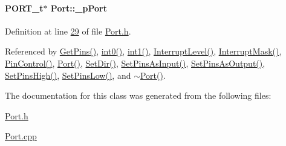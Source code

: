\hypertarget{class_port_a1475caa8ec2e667350eae96d4b7a28ac}{
\paragraph[{\_\-pPort}]{\setlength{\rightskip}{0pt plus 5cm}PORT\_\-t$\ast$ {\bf Port::\_\-pPort}}\hfill}
\label{class_port_a1475caa8ec2e667350eae96d4b7a28ac}


Definition at line \hyperlink{_port_8h_source_l00029}{29} of file \hyperlink{_port_8h_source}{Port.h}.



Referenced by \hyperlink{_port_8cpp_source_l00116}{GetPins()}, \hyperlink{_port_8cpp_source_l00075}{int0()}, \hyperlink{_port_8cpp_source_l00083}{int1()}, \hyperlink{_port_8cpp_source_l00121}{InterruptLevel()}, \hyperlink{_port_8cpp_source_l00132}{InterruptMask()}, \hyperlink{_port_8cpp_source_l00141}{PinControl()}, \hyperlink{_port_8cpp_source_l00058}{Port()}, \hyperlink{_port_8cpp_source_l00091}{SetDir()}, \hyperlink{_port_8cpp_source_l00096}{SetPinsAsInput()}, \hyperlink{_port_8cpp_source_l00101}{SetPinsAsOutput()}, \hyperlink{_port_8cpp_source_l00106}{SetPinsHigh()}, \hyperlink{_port_8cpp_source_l00111}{SetPinsLow()}, and \hyperlink{_port_8cpp_source_l00064}{$\sim$Port()}.



The documentation for this class was generated from the following files:\begin{DoxyCompactItemize}
\item 
\hyperlink{_port_8h}{Port.h}\item 
\hyperlink{_port_8cpp}{Port.cpp}\end{DoxyCompactItemize}
